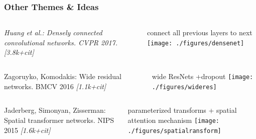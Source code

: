 \documentclass[compress]{beamer}
\begin{document}
\begin{frame} \frametitle{Other Themes \& Ideas}
\setlength{\tabcolsep}{2pt}

\begin{columns}
\begin{column}{0.55\textwidth}
{\small \textit{Huang et al.: Densely connected convolutional networks. CVPR 2017.  [3.8k+cit]}}
\end{column}
\begin{column}{0.50\textwidth}
connect all previous layers to next 
\texttt{[image: ./figures/densenet]}
\end{column}
\end{columns}

\vspace*{4mm}
\begin{columns}
\begin{column}{0.55\textwidth}
{\small Zagoruyko, Komodakis: Wide residual networks. BMCV 2016 \textit{[1.1k+cit]}}
\end{column}
\vspace*{2mm}

\begin{column}{0.50\textwidth}
wide ResNets +dropout
\texttt{[image: ./figures/wideres]}
\end{column}
\end{columns}

\vspace*{4mm}
\begin{columns}
\begin{column}{0.55\textwidth}
{\small Jaderberg, Simonyan, Zisserman: Spatial transformer networks. NIPS 2015 \textit{[1.6k+cit]}}
\end{column}
\begin{column}{0.50\textwidth}
parameterized transforms + spatial attention mechanism
\texttt{[image: ./figures/spatialransform]}
\end{column}
\end{columns}
\end{frame}
\end{document}
